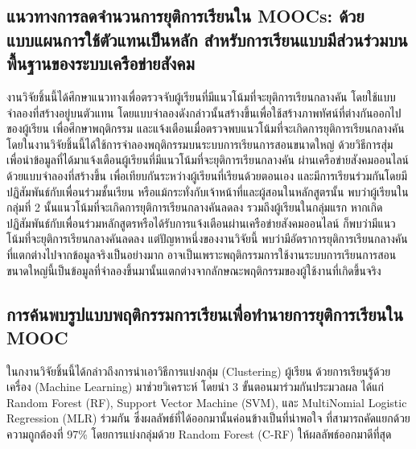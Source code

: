 \documentclass[conference]{IEEEtran}
\def\moocs{การเรียนการสอนขนาดใหญ่}
\def\MOOCs{ระบบ{\moocs}}
\def\dropout{ยุติการเรียนกลางคัน}
\begin{document}
    \subsection{แนวทางการลดจำนวนการยุติการเรียนใน MOOCs: ด้วยแบบแผนการใช้ตัวแทนเป็นหลัก สำหรับการเรียนแบบมีส่วนร่วมบนพื้นฐานของระบบเครือข่ายสังคม \cite{paper:8924433}}
    งานวิจัยชิ้นนี้ได้ศึกษาแนวทางเพื่อตรวจจับผู้เรียนที่มีแนวโน้มที่จะ{\dropout} โดยใช้แบบจำลองที่สร้างอยู่บนตัวแทน
    โดยแบบจำลองดังกล่าวนั้นสร้างขึ้นเพื่อใช้สร้างภาพทัศน์ที่ต่างกันออกไปของผู้เรียน 
    เพื่อศึกษาพฤติกรรม และแจ้งเตือนเมื่อตรวจพบแนวโน้มที่จะเกิดการ{\dropout} 
    โดยในงานวิจัยชิ้นนี้ได้ใช้การจำลองพฤติกรรมบน{\MOOCs} ด้วยวิธีการสุ่ม
    เพื่อนำข้อมูลที่ได้มาแจ้งเตือนผู้เรียนที่มีแนวโน้มที่จะ{\dropout} 
    ผ่านเครือข่ายสังคมออนไลน์ ด้วยแบบจำลองที่สร้างขึ้น 
    เพื่อเทียบกันระหว่างผู้เรียนที่เรียนด้วยตอนเอง และมีการเรียนร่วมกันโดยมีปฏิสัมพันธ์กับเพื่อนร่วมชั้นเรียน 
    หรือแม้กระทั่งกับเจ้าหน้าที่และผู้สอนในหลักสูตรนั้น
    พบว่าผู้เรียนในกลุ่มที่ 2 นั้นแนวโน้มที่จะเกิดการ{\dropout}ลดลง 
    รวมถึงผู้เรียนในกลุ่มแรก หากเกิดปฏิสัมพันธ์กับเพื่อนร่วมหลักสูตรหรือได้รับการแจ้งเตือนผ่านเครือข่ายสังคมออนไลน์
    ก็พบว่ามีแนวโน้มที่จะ{\dropout}ลดลง แต่ปัญหาหนึ่งของงานวิจัยนี้ พบว่ามีอัตราการ{\dropout} 
    ที่แตกต่างไปจากข้อมูลจริงเป็นอย่างมาก 
    อาจเป็นเพราะพฤติกรรมการใช้งาน{\MOOCs}นี้เป็นข้อมูลที่จำลองขึ้นมานั้นแตกต่างจากลักษณะพฤติกรรมของผู้ใช้งานที่เกิดขึ้นจริง

    \subsection{การค้นพบรูปแบบพฤติกรรมการเรียนเพื่อทำนายการยุติการเรียนใน MOOC \cite{paper:8085583}}
    ในกงานวิจัยชิ้นนี้ได้กล่าวถึงการนำเอาวิธีการแบ่งกลุ่ม (Clustering) ผู้เรียน ด้วยการเรียนรู้ด้วยเครื่อง (Machine Learning)
    มาช่วยวิเคราะห์ โดยนำ 3 ขั้นตอนมาร่วมกันประมวลผล ได้แก่ Random Forest (RF), 
    Support Vector Machine (SVM), และ MultiNomial Logistic Regression (MLR) ร่วมกัน 
    ซึ่งผลลัพธ์ที่ได้ออกมานั้นค่อนข้างเป็นที่น่าพอใจ ที่สามารถคัดแยกด้วยความถูกต้องที่ 97\%
    โดยการแบ่งกลุ่มด้วย Random Forest (C-RF) ให้ผลลัพธ์ออกมาดีที่สุด
\end{document}
